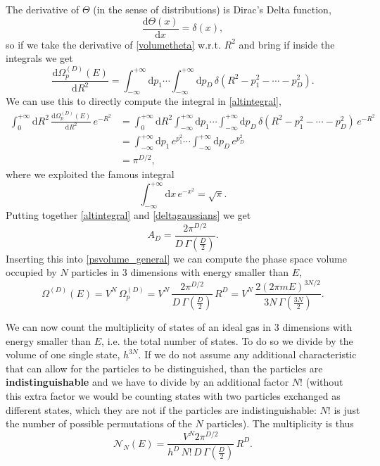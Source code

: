 \documentclass[12pt]{article}
\numberwithin{equation}{section} %
\begin{document}
The derivative of $\Theta$ (in the sense of distributions) is Dirac's Delta function,
\begin{equation}
\frac{\mathrm{d}\Theta(x)}{\mathrm{d}x} = \delta(x),
\end{equation}
so if we take the derivative of \eqref{volumetheta} w.r.t. $R^2$ and bring if inside the integrals we get
\begin{equation}
\frac{\mathrm{d}\Omega^{(D)}_p (E)}{\mathrm{d}R^2} = \int_{-\infty}^{+\infty} \mathrm{d}p_1 \cdots \int_{-\infty}^{+\infty} \mathrm{d}p_{D}\,\delta\left( R^2 - p_1^2 - \cdots - p_D^2 \right).
\end{equation}
We can use this to directly compute the integral in \eqref{altintegral},
\begin{equation}
\label{deltagaussians}
\begin{aligned}
\int_0^{+\infty} \mathrm{d}R^2\,\frac{\mathrm{d} \Omega^{(D)}_p (E)}{\mathrm{d} R^2}\,e^{-R^2} &= \int_0^{+\infty} \mathrm{d}R^2 \int_{-\infty}^{+\infty} \mathrm{d}p_1 \cdots \int_{-\infty}^{+\infty} \mathrm{d}p_{D}\,\delta\left( R^2 - p_1^2 - \cdots - p_D^2 \right)\,e^{-R^2}\\
&= \int_{-\infty}^{+\infty} \mathrm{d}p_1\,e^{p_1^2} \cdots \int_{-\infty}^{+\infty} \mathrm{d}p_{D}\,e^{p_D^2}\\
&= \pi^{D/2},
\end{aligned}
\end{equation}
where we exploited the famous integral
\begin{equation}
\int_{-\infty}^{+\infty}\mathrm{d}x\,e^{-x^2} = \sqrt{\pi}.
\end{equation}
Putting together \eqref{altintegral} and \eqref{deltagaussians} we get
\begin{equation}
A_D = \frac{2 \pi^{D/2}}{D\,\Gamma\left(\frac{D}{2}\right)}.
\end{equation}
Inserting this into \eqref{psvolume_general} we can compute the phase space volume occupied by $N$ particles in $3$ dimensions with energy smaller than $E$,
\begin{equation}
\label{idealgas_psvolume}
\Omega^{(D)} (E)= V^N\,\Omega^{(D)}_p = V^N\,\frac{2\pi^{D/2}}{D\,\Gamma\left(\frac{D}{2}\right)}\,R^D = V^N\,\frac{2\left(2\pi m E\right)^{3N/2}}{3N\,\Gamma\left(\frac{3N}{2}\right)}.
\end{equation}

We can now count the multiplicity of states of an ideal gas in $3$ dimensions with energy smaller than $E$, i.e. the total number of states. To do so we divide by the volume of one single state, $h^{3N}$. If we do not assume any additional characteristic that can allow for the particles to be distinguished, than the particles are \textbf{indistinguishable} and we have to divide by an additional factor $N!$ (without this extra factor we would be counting states with two particles exchanged as different states, which they are not if the particles are indistinguishable: $N!$ is just the number of possible permutations of the $N$ particles). The multiplicity is thus
\begin{equation}
\label{idealgas_multiplicity}
\mathcal{N}_N(E) = \frac{V^N 2\pi^{D/2}}{h^{D}\,N!\,D\,\Gamma\left(\frac{D}{2}\right)}\,R^D.
\end{equation}
\end{document}
